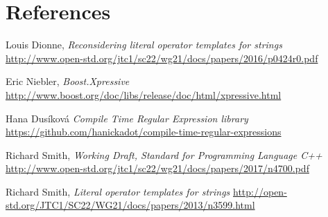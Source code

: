 \documentclass{wg21}
\begin{document}
\section{References}
\renewcommand{\section}[2]{}%
\begin{thebibliography}{9}

    Louis Dionne,
    \emph{Reconsidering literal operator templates for strings}\newline
    \url{http://www.open-std.org/jtc1/sc22/wg21/docs/papers/2016/p0424r0.pdf}

    Eric Niebler,
    \emph{Boost.Xpressive}\newline
    \url{http://www.boost.org/doc/libs/release/doc/html/xpressive.html}

    Hana Dus\'{i}kov\'{a}
    \emph{Compile Time Regular Expression library}\newline
    \url{https://github.com/hanickadot/compile-time-regular-expressions}

    Richard Smith,
    \emph{Working Draft, Standard for Programming Language C++}\newline
    \url{http://www.open-std.org/jtc1/sc22/wg21/docs/papers/2017/n4700.pdf}

    Richard Smith,
    \emph{Literal operator templates for strings}\newline
    \url{http://open-std.org/JTC1/SC22/WG21/docs/papers/2013/n3599.html}

\end{thebibliography}
\end{document}
